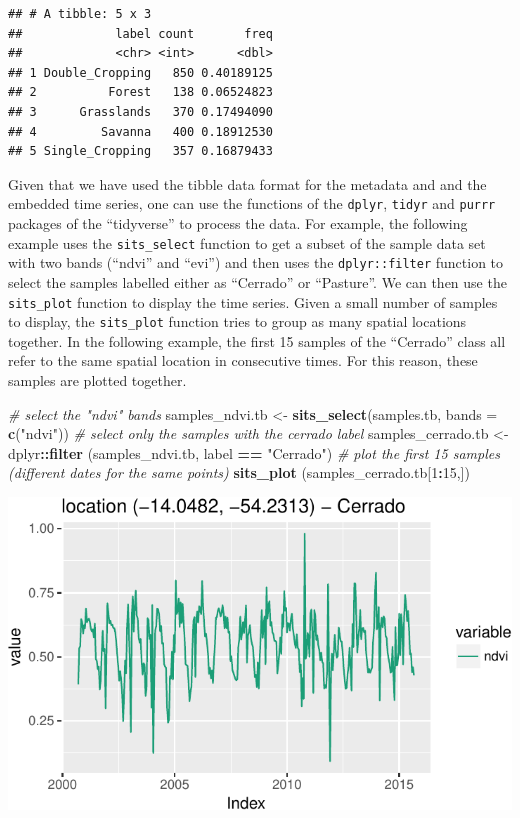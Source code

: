 \documentclass[11pt,]{article}
\newenvironment{Shaded}{\begin{snugshade}}{\end{snugshade}}
\newcommand{\KeywordTok}[1]{\textcolor[rgb]{0.13,0.29,0.53}{\textbf{#1}}}
\newcommand{\DataTypeTok}[1]{\textcolor[rgb]{0.13,0.29,0.53}{#1}}
\newcommand{\DecValTok}[1]{\textcolor[rgb]{0.00,0.00,0.81}{#1}}
\newcommand{\StringTok}[1]{\textcolor[rgb]{0.31,0.60,0.02}{#1}}
\newcommand{\CommentTok}[1]{\textcolor[rgb]{0.56,0.35,0.01}{\textit{#1}}}
\newcommand{\OperatorTok}[1]{\textcolor[rgb]{0.81,0.36,0.00}{\textbf{#1}}}
\newcommand{\NormalTok}[1]{#1}
\begin{document}
\begin{verbatim}
## # A tibble: 5 x 3
##             label count       freq
##             <chr> <int>      <dbl>
## 1 Double_Cropping   850 0.40189125
## 2          Forest   138 0.06524823
## 3      Grasslands   370 0.17494090
## 4         Savanna   400 0.18912530
## 5 Single_Cropping   357 0.16879433
\end{verbatim}

Given that we have used the tibble data format for the metadata and and
the embedded time series, one can use the functions of the
\texttt{dplyr}, \texttt{tidyr} and \texttt{purrr} packages of the
``tidyverse'' \citep{Wickham2017} to process the data. For example, the
following example uses the \texttt{sits\_select} function to get a
subset of the sample data set with two bands (``ndvi'' and ``evi'') and
then uses the \texttt{dplyr::filter} function to select the samples
labelled either as ``Cerrado'' or ``Pasture''. We can then use the
\texttt{sits\_plot} function to display the time series. Given a small
number of samples to display, the \texttt{sits\_plot} function tries to
group as many spatial locations together. In the following example, the
first 15 samples of the ``Cerrado'' class all refer to the same spatial
location in consecutive times. For this reason, these samples are
plotted together.

\begin{Shaded}
\begin{Highlighting}[]
\CommentTok{# select the "ndvi" bands}
\NormalTok{samples_ndvi.tb <-}\StringTok{ }\KeywordTok{sits_select}\NormalTok{(samples.tb, }\DataTypeTok{bands =} \KeywordTok{c}\NormalTok{(}\StringTok{"ndvi"}\NormalTok{))}
\CommentTok{# select only the samples with the cerrado label}
\NormalTok{samples_cerrado.tb <-}\StringTok{ }\NormalTok{dplyr}\OperatorTok{::}\KeywordTok{filter}\NormalTok{ (samples_ndvi.tb, label }\OperatorTok{==}\StringTok{ "Cerrado"}\NormalTok{)}
\CommentTok{# plot the first 15 samples (different dates for the same points)}
\KeywordTok{sits_plot}\NormalTok{ (samples_cerrado.tb[}\DecValTok{1}\OperatorTok{:}\DecValTok{15}\NormalTok{,])}
\end{Highlighting}
\end{Shaded}

\begin{center}\includegraphics{sits_description_files/figure-latex/unnamed-chunk-10-1} \end{center}
\end{document}
